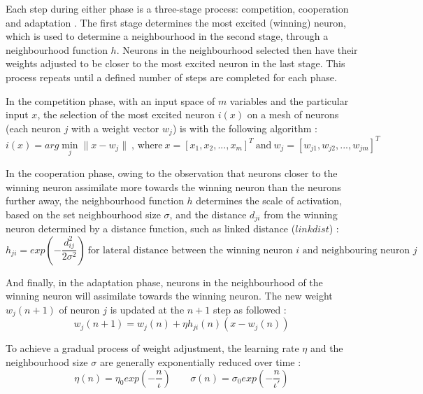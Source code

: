 \documentclass[10pt, oneside]{article}
\begin{document}
Each step during either phase is a three-stage process: competition, cooperation and adaptation \cite[pp. 429-430]{haykin2008}. The first stage determines the most excited (winning) neuron, which is used to determine a neighbourhood in the second stage, through a neighbourhood function $h$. Neurons in the neighbourhood selected then have their weights adjusted to be closer to the most excited neuron in the last stage. This process repeats until a defined number of steps are completed for each phase.

In the competition phase, with an input space of $m$ variables and the particular input $x$, the selection of the most excited neuron $i(x)$ on a mesh of neurons (each neuron $j$ with a weight vector $w_j$) is with the following algorithm \cite[p. 430]{haykin2008}:
\begin{equation}
i(x) = arg \min_{j}\|x  - w_{j}\| \ \text{, where}\ x = [x_1, x_2, ..., x_m]^T \ \text{and} \ w_j = [w_{j1}, w_{j2}, ..., w_{jm}]^T
\end{equation}

In the cooperation phase, owing to the observation that neurons closer to the winning neuron assimilate more towards the winning neuron than the neurons further away, the neighbourhood function $h$ determines the scale of activation, based on the set neighbourhood size $\sigma$, and the distance $d_{ji}$ from the winning neuron determined by a distance function, such as linked distance ($linkdist$) \cite[p. 431]{haykin2008}:
\begin{equation}
h_{ji} = exp(-\frac{d^2_{ij}}{2\sigma^2}) \ \text{for lateral distance between the winning neuron $i$ and neighbouring neuron $j$}
\end{equation}

And finally, in the adaptation phase, neurons in the neighbourhood of the winning neuron will assimilate towards the winning neuron. The new weight $w_j(n+1)$ of neuron $j$ is updated at the $n+1$ step as followed \cite[p. 21]{som-lecture}:
\begin{equation}
w_j(n+1) = w_j(n) + \eta h_{ji}(n)(x-w_j(n))
\end{equation}

To achieve a gradual process of weight adjustment, the learning rate $\eta$ and the neighbourhood size $\sigma$ are generally exponentially reduced over time \cite[pp. 21-22]{som-lecture}:
\begin{equation}
\eta (n) = \eta_0 exp(-\frac{n}{\iota}) \;\;\;\;\;\;\;  \sigma (n) = \sigma_0 exp(-\frac{n}{\iota'})
\end{equation}
\end{document}
